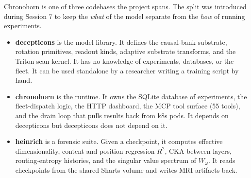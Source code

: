 \documentclass[11pt,openany]{book}
\theoremstyle{definition}
\theoremstyle{plain}
\newcommand{\omegaproj}{W_\omega}
\begin{document}
Chronohorn is one of three codebases the project spans. The split was
introduced during Session 7 to keep the \emph{what} of the model separate
from the \emph{how} of running experiments.

\begin{center}
\end{center}

\begin{itemize}
  \item \textbf{decepticons} is the model library. It defines the
    causal-bank substrate, rotation primitives, readout kinds, adaptive
    substrate transforms, and the Triton scan kernel. It has no knowledge of
    experiments, databases, or the fleet. It can be used standalone by a
    researcher writing a training script by hand.
  \item \textbf{chronohorn} is the runtime. It owns the SQLite database
    of experiments, the fleet-dispatch logic, the HTTP dashboard, the MCP
    tool surface (55 tools), and the drain loop that pulls results back
    from k8s pods. It depends on decepticons but decepticons does not
    depend on it.
  \item \textbf{heinrich} is a forensic suite. Given a checkpoint, it
    computes effective dimensionality, content and position regression
    $R^2$, CKA between layers, routing-entropy histories, and the singular
    value spectrum of $\omegaproj$. It reads checkpoints from the shared
    Sharts volume and writes MRI artifacts back.
\end{itemize}
\end{document}
